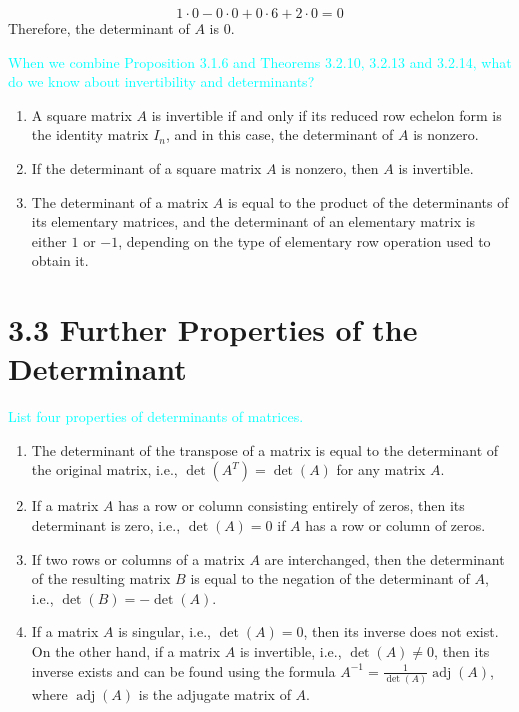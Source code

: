 \documentclass[fontsize=12pt]{scrartcl}
\begin{document}
$$1 \cdot 0 - 0 \cdot 0 + 0 \cdot 6 + 2 \cdot 0 = 0 $$
\noindent
Therefore, the determinant of $A$ is 0.
\\

\newpage

\noindent
\textcolor{cyan}{When we combine Proposition 3.1.6 and Theorems 3.2.10, 3.2.13 and 3.2.14, what do we know about invertibility and determinants?}
\begin{enumerate}
	\item A square matrix $A$ is invertible if and only if its reduced row echelon form is the identity matrix $I_n$, and in this case, the determinant of $A$ is nonzero.
	\item If the determinant of a square matrix $A$ is nonzero, then $A$ is invertible.
	\item The determinant of a matrix $A$ is equal to the product of the determinants of its elementary matrices, and the determinant of an elementary matrix is either $1$ or $-1$, depending on the type of elementary row operation used to obtain it.
\end{enumerate}

\newpage

\section{3.3 Further Properties of the Determinant}

\bigskip

\noindent
\textcolor{cyan}{List four properties of determinants of matrices.}

\begin{enumerate}
	\item The determinant of the transpose of a matrix is equal to the determinant of the original matrix, i.e., $\det(A^T) = \det(A)$ for any matrix $A$.
	\item If a matrix $A$ has a row or column consisting entirely of zeros, then its determinant is zero, i.e., $\det(A) = 0$ if $A$ has a row or column of zeros.
	\item If two rows or columns of a matrix $A$ are interchanged, then the determinant of the resulting matrix $B$ is equal to the negation of the determinant of $A$, i.e., $\det(B) = -\det(A)$.
	\item If a matrix $A$ is singular, i.e., $\det(A) = 0$, then its inverse does not exist. On the other hand, if a matrix $A$ is invertible, i.e., $\det(A) \neq 0$, then its inverse exists and can be found using the formula $A^{-1} = \frac{1}{\det(A)}\operatorname{adj}(A)$, where $\operatorname{adj}(A)$ is the adjugate matrix of $A$.
\end{enumerate}
\end{document}
